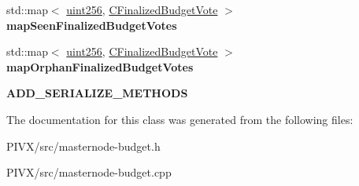 \begin{DoxyCompactItemize}
\item 
\mbox{\label{class_c_budget_manager_aecbf6ad23e6f6044672d5619d3e7c40d}} 
std\+::map$<$ \mbox{\hyperlink{classuint256}{uint256}}, \mbox{\hyperlink{class_c_finalized_budget_vote}{C\+Finalized\+Budget\+Vote}} $>$ {\bfseries map\+Seen\+Finalized\+Budget\+Votes}
\item 
\mbox{\label{class_c_budget_manager_ad0d6a72545f4057ff5ffba11fc122ac7}} 
std\+::map$<$ \mbox{\hyperlink{classuint256}{uint256}}, \mbox{\hyperlink{class_c_finalized_budget_vote}{C\+Finalized\+Budget\+Vote}} $>$ {\bfseries map\+Orphan\+Finalized\+Budget\+Votes}
\item 
\mbox{\label{class_c_budget_manager_a078aded2505dc7329f29b0bd240b1649}} 
{\bfseries A\+D\+D\+\_\+\+S\+E\+R\+I\+A\+L\+I\+Z\+E\+\_\+\+M\+E\+T\+H\+O\+DS}
\end{DoxyCompactItemize}


The documentation for this class was generated from the following files\+:\begin{DoxyCompactItemize}
\item 
P\+I\+V\+X/src/masternode-\/budget.\+h\item 
P\+I\+V\+X/src/masternode-\/budget.\+cpp\end{DoxyCompactItemize}
